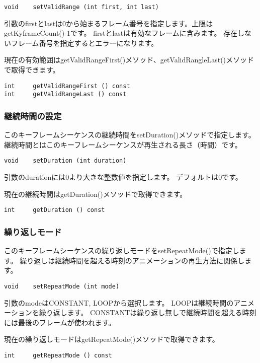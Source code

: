 \begin{verbatim}
void 	setValidRange (int first, int last)
\end{verbatim}

引数のfirstとlastは0から始まるフレーム番号を指定します。上限はgetKyframeCount()-1です。
firstとlastは有効なフレームに含みます。
存在しないフレーム番号を指定するとエラーになります。

現在の有効範囲はgetValidRangeFirst()メソッド、getValidRangleLast()メソッドで取得できます。

\begin{verbatim}
int 	getValidRangeFirst () const
int 	getValidRangeLast () const
\end{verbatim}

\subsubsection{継続時間の設定}

このキーフレームシーケンスの継続時間をsetDuration()メソッドで指定します。
継続時間とはこのキーフレームシーケンスが再生される長さ（時間）です。

\begin{verbatim}
void 	setDuration (int duration)
\end{verbatim}

引数のdurationには0より大きな整数値を指定します。
デフォルトは0です。

現在の継続時間はgetDuration()メソッドで取得できます。

\begin{verbatim}
int 	getDuration () const
\end{verbatim}


\subsubsection{繰り返しモード}

このキーフレームシーケンスの繰り返しモードをsetRepeatMode()で指定します。
繰り返しは継続時間を超える時刻のアニメーションの再生方法に関係します。

\begin{verbatim}
void 	setRepeatMode (int mode)
\end{verbatim}

引数のmodeはCONSTANT, LOOPから選択します。
LOOPは継続時間のアニメーションを繰り返します。
CONSTANTは繰り返し無しで継続時間を超える時刻には最後のフレームが使われます。

現在の繰り返しモードはgetRepeatMode()メソッドで取得できます。

\begin{verbatim}
int 	getRepeatMode () const
\end{verbatim}

